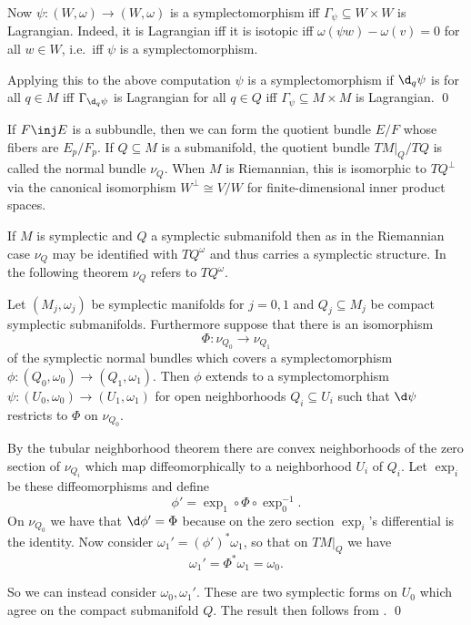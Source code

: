     Now $\psi\colon(W,\omega)\to(W,\omega)$ is a symplectomorphism iff $\Gamma_\psi\subseteq W\times W$ is Lagrangian.
    Indeed, it is Lagrangian iff it is isotopic iff $\omega(\psi w)-\omega(v)=0$ for all $w\in W$, i.e.\ iff $\psi$ is a symplectomorphism.

    Applying this to the above computation $\psi$ is a symplectomorphism if $\d_q\psi$ is for all $q\in M$ iff $\Gamma_{\d_q\psi}$ is Lagrangian
    for all $q\in Q$ iff $\Gamma_\psi\subseteq M\times M$ is Lagrangian.
    \qed

\eproof

If $F\inj E$ is a subbundle, then we can form the quotient bundle $E/F$ whose fibers are $E_p/F_p$.
If $Q\subseteq M$ is a submanifold, the quotient bundle $TM|_Q/TQ$ is called the {\emphcolor normal bundle} $\nu_Q$.
When $M$ is Riemannian, this is isomorphic to $TQ^\perp$ via the canonical isomorphism $W^\perp\cong V/W$ for finite-dimensional inner product spaces.

If $M$ is symplectic and $Q$ a symplectic submanifold then as in the Riemannian case $\nu_Q$ may be identified with $TQ^\omega$ and thus carries
a symplectic structure.
In the following theorem $\nu_Q$ refers to $TQ^\omega$.

\bthrm

    Let $(M_j,\omega_j)$ be symplectic manifolds for $j=0,1$ and $Q_j\subseteq M_j$ be compact symplectic submanifolds.
    Furthermore suppose that there is an isomorphism
    $$ \Phi\colon\nu_{Q_0} \to \nu_{Q_1} $$
    of the symplectic normal bundles which covers a symplectomorphism $\phi\colon(Q_0,\omega_0)\to(Q_1,\omega_1)$.
    Then $\phi$ extends to a symplectomorphism $\psi\colon(U_0,\omega_0)\to(U_1,\omega_1)$ for open neighborhoods $Q_i\subseteq U_i$
    such that $\d\psi$ restricts to $\Phi$ on $\nu_{Q_0}$.

\ethrm

\bproof

    By the tubular neighborhood theorem there are convex neighborhoods of the zero section of $\nu_{Q_i}$ which map
    diffeomorphically to a neighborhood $U_i$ of $Q_i$.
    Let $\exp_i$ be these diffeomorphisms and define
    $$ \phi' = \exp_1\circ\Phi\circ\exp_0^{-1} . $$
    On $\nu_{Q_0}$ we have that $\d\phi'=\Phi$ because on the zero section $\exp_i$'s differential is the identity.
    Now consider $\omega_1'=(\phi')^*\omega_1$, so that on $TM|_Q$ we have
    $$ \omega_1' = \Phi^*\omega_1 = \omega_0 . $$

    So we can instead consider $\omega_0,\omega_1'$.
    These are two symplectic forms on $U_0$ which agree on the compact submanifold $Q$.
    The result then follows from .
    \qed

